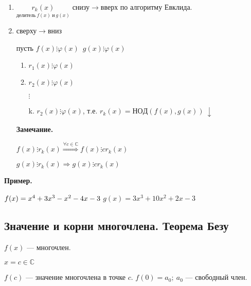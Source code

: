 \documentclass{article}
\begin{document}
    \begin{enumerate}
        \item \(\underset{\textrm{делитель}\ f(x)\ \textrm{и}\ g(x)}{r_{k}(x)}\) снизу\(\rightarrow\)вверх по алгоритму Евклида.
        
        \item сверху\(\rightarrow\)вниз
        
        пусть \(f(x) \vdots \varphi(x) \)\
        \(g(x) \vdots \varphi(x) \)\
        
        \begin{enumerate}
            \item \(r_1(x) \vdots \varphi(x) \)
            \item \(r_2(x) \vdots \varphi(x) \)
            
            \(\vdots\)
            
            \item[k.] \(r_2(x) \vdots \varphi(x) \), т.е. \(r_{k}(x) = НОД(f(x),g(x)) \ \downarrow\)
        \end{enumerate}
        
        \textbf{Замечание.}

        \(f(x)\vdots r_k(x) \overset{\forall c \in \mathbb{C}}{\Rightarrow} f(x)\vdots c r_k(x)\)
        
        \(g(x)\vdots r_k(x) \Rightarrow g(x) \vdots c r_k(x)\)
    
    \end{enumerate}


    \textbf{Пример.}
    
    \(f(x) = x^4 + 3x^3 - x^2 - 4x -3\\\)
    \(g(x) = 3x^3 + 10x^2 + 2x - 3\)

    

    \subsection{Значение и корни многочлена. Теорема Безу}

    \(f(x)\) --- многочлен.

    \(x = c \in \mathbb{C}\)

    \(f(c)\) --- значение многочлена в точке \(c\).
    \(f(0) = a_0;\ a_0\) --- свободный член.
\end{document}
